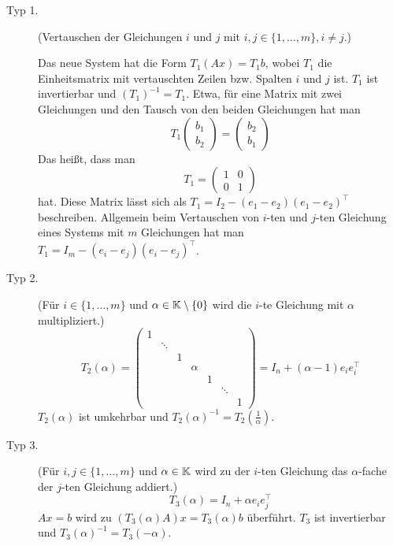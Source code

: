 \begin{description}
	\item[Typ 1.]
		(Vertauschen der Gleichungen $ i $ und $ j $ mit $ i,j \in \{ 1,\ldots,m \}, i \neq j $.)
		
		Das neue System hat die Form $ T_1(Ax) = T_1b $, wobei $ T_1 $ die Einheitsmatrix mit vertauschten Zeilen bzw. Spalten $ i $ und $ j $ ist. $ T_1 $ ist invertierbar und $ (T_1)^{-1}=T_1 $. Etwa, für eine Matrix mit zwei Gleichungen und den Tausch von den beiden Gleichungen hat man 
		\[ 
			T_1 \begin{pmatrix} b_1 \\ b_2 \end{pmatrix} = \begin{pmatrix} b_2 \\ b_1 \end{pmatrix} 
			\] 
			Das heißt, dass man 
			\[
				T_1 = \begin{pmatrix} 1 & 0 \\ 
					0 & 1 
				\end{pmatrix} 
			\]
			hat. Diese Matrix lässt sich als $T_1 = I_2 - (e_1 - e_2) (e_1 - e_2)^\top$ beschreiben. Allgemein beim Vertauschen von $i$-ten und $j$-ten Gleichung eines Systems mit $m$ Gleichungen hat man 
			$T_1 = I_m - (e_i-e_j)(e_i-e_j)^\top$. 
	\item[Typ 2.]
		(Für $ i\in\{ 1,\ldots,m \} $ und $ \alpha\in\mathbb K\setminus\{0\} $ wird die $ i $-te Gleichung mit $ \alpha $ multipliziert.)
		\begin{equation*}
			T_2(\alpha) =
			\left( \begin{matrix}
			1 &  &  &  &  &  &  \\ 
			 & \ddots &  &  &  &  &  \\ 
			 &  & 1 &  &  &  &  \\ 
			 &  &  & \alpha &  &  &  \\ 
			 &  &  &  & 1 &  &  \\ 
			 &  &  &  &  & \ddots &  \\ 
			 &  &  &  &  &  & 1
			\end{matrix} \right)
			= I_n + (\alpha-1)e_ie_i^\top
		\end{equation*}
		$ T_2(\alpha) $ ist umkehrbar und $ T_2(\alpha)^{-1} = T_2(\frac{1}{\alpha}) $.
	\item[Typ 3.]
		(Für $ i,j\in\{ 1,\ldots,m \} $ und $ \alpha\in\mathbb K $ wird zu der $ i $-ten Gleichung das $ \alpha $-fache der $ j $-ten Gleichung addiert.)
		\begin{equation*}
			T_3(\alpha) = I_n + \alpha e_ie_j^\top
		\end{equation*}
		$ Ax=b $ wird zu $ (T_3(\alpha)A)x = T_3(\alpha)b $ überführt. $ T_3 $ ist invertierbar und $ T_3(\alpha)^{-1} = T_3(-\alpha) $.
\end{description}

